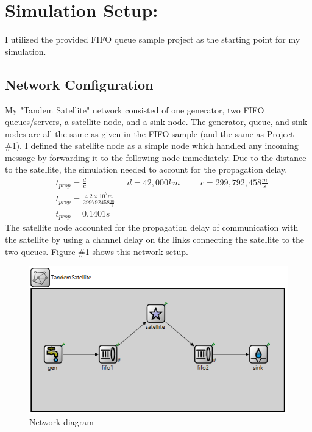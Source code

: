 \documentclass{article}
\begin{document}

\section*{Simulation Setup:}
I utilized the provided FIFO queue sample project as the starting point for my simulation.

\subsection*{Network Configuration}  
My "Tandem Satellite" network consisted of one generator, two FIFO queues/servers, a satellite node, and a sink node.  
The generator, queue, and sink nodes are all the same as given in the FIFO sample (and the same as Project \#1).  
I defined the satellite node as a simple node which handled any incoming message by forwarding it to the following node immediately.  
Due to the distance to the satellite, the simulation needed to account for the propagation delay.
\begin{align*}
& t_{prop} = \frac{d}{c} \hspace{2cm} d = 42,000km  \hspace{1cm} c = 299,792,458 \frac{m}{s} \\
& t_{prop} = \frac{4.2 \times 10^7 m}{299792458 \frac{m}{s}} \\
& \boxed{t_{prop} = 0.1401 s}
\end{align*}
The satellite node accounted for the propagation delay of communication with the satellite by using a channel delay on the links connecting the satellite to the two queues.
Figure \#\ref{diagram} shows this network setup. 

\begin{figure}[h!]
	\begin{center}
	\includegraphics[scale=1.0]{Images/TandemSatellite.PNG}
	\vspace{-.25cm}
	\caption{Network diagram}
	\label{diagram}
	\end{center}
\end{figure}
\end{document}
